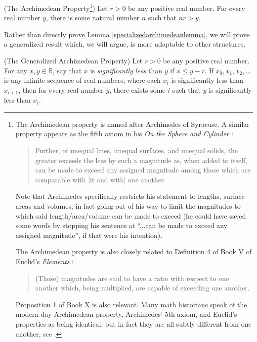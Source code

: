\documentclass[twoside,11pt]{article}
\begin{document}
\begin{lemma}
\label{specializedarchimedeanlemma}
(The Archimedean Property\footnote{The Archimedean property is named after Archimedes of Syracuse.
A similar property appears as the fifth axiom in his \emph{On the Sphere
and Cylinder} \citep{archimedes}:
\begin{quote}
    Further, of unequal lines, unequal surfaces, and unequal
    solids, the greater exceeds the less by such a magnitude
    as, when added to itself, can be made to exceed any
    assigned magnitude among those which are comparable with
    [it and with] one another.
\end{quote}
Note that Archimedes specifically restricts his statement to
lengths, surface areas and volumes, in fact going out of his
way to limit the magnitudes to which said length/area/volume
can be made to exceed (he could have saved some words
by stopping his sentence at ``...can be made to exceed any
assigned magnitude'', if that were his intention).

The Archimedean property is also closely related to Definition 4 of Book V of Euclid's
\emph{Elements} \citep{euclid}:
\begin{quote}
    (Those) magnitudes are said to have a ratio
    with respect to one another which, being
    multiplied, are capable of exceeding one
    another.
\end{quote}
Proposition 1 of Book X is also relevant.
Many math historians
speak of the modern-day Archimedean property, Archimedes' 5th axiom, and Euclid's
properties as being identical, but in fact they are all subtly different from one
another, see \cite{bair2013mathematical}.})
Let $r>0$ be any positive real number.
For every real number $y$, there is some natural number $n$
such that $nr>y$.
\end{lemma}

Rather than directly prove Lemma \ref{specializedarchimedeanlemma},
we will prove a generalized result which, we will argue, is
more adaptable to other structures.

\begin{lemma}
\label{generalizedarchimedeanlemma}
(The Generalized Archimedean Property)
Let $r>0$ be any positive real number.
For any $x,y\in\mathbb R$, say that $x$ is \emph{significantly less}
than $y$ if $x\leq y-r$.
If $x_0,x_1,x_2,\ldots$ is any infinite sequence of real numbers,
where each $x_i$ is significantly less than $x_{i+1}$, then for every real number $y$,
there exists some $i$ such that $y$ is significantly less than $x_i$.
\end{lemma}
\end{document}
